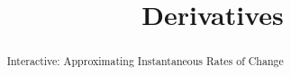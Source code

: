 \documentclass[handout]{ximera}
\title{Derivatives}
\begin{document}
\begin{abstract} Interactive: Approximating Instantaneous Rates of Change
\end{abstract}

\maketitle

\end{document}
